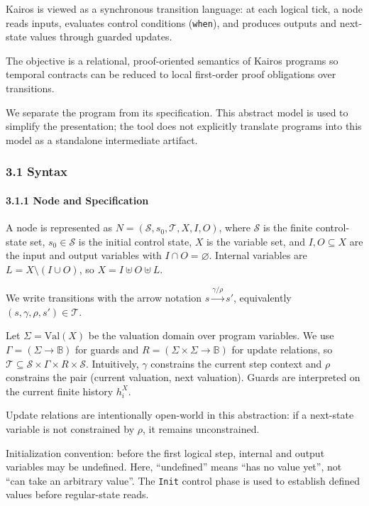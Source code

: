 \documentclass[
]{article}
\begin{document}
Kairos is viewed as a synchronous transition language: at each logical
tick, a node reads inputs, evaluates control conditions (\texttt{when}),
and produces outputs and next-state values through guarded updates.

The objective is a relational, proof-oriented semantics of Kairos
programs so temporal contracts can be reduced to local first-order proof
obligations over transitions.

We separate the program from its specification. This abstract model is
used to simplify the presentation; the tool does not explicitly
translate programs into this model as a standalone intermediate
artifact.

\subsubsection{3.1 Syntax}\label{syntax}

\paragraph{3.1.1 Node and Specification}\label{node-and-specification}

A node is represented as \(N=(\mathcal S,s_0,\mathcal T,X,I,O)\), where
\(\mathcal S\) is the finite control-state set, \(s_0\in\mathcal S\) is
the initial control state, \(X\) is the variable set, and
\(I,O\subseteq X\) are the input and output variables with
\(I\cap O=\varnothing\). Internal variables are
\(L=X\setminus(I\cup O)\), so \(X=I\uplus O\uplus L\).

We write transitions with the arrow notation
\(s \xrightarrow{\gamma/\rho} s'\), equivalently
\((s,\gamma,\rho,s')\in\mathcal T\).

Let \(\Sigma=\mathrm{Val}(X)\) be the valuation domain over program
variables. We use \(\Gamma=(\Sigma\to\mathbb B)\) for guards and
\(R=(\Sigma\times\Sigma\to\mathbb B)\) for update relations, so
\(\mathcal T\subseteq\mathcal S\times\Gamma\times R\times\mathcal S\).
Intuitively, \(\gamma\) constrains the current step context and \(\rho\)
constrains the pair (current valuation, next valuation). Guards are
interpreted on the current finite history \(h_i^X\).

Update relations are intentionally open-world in this abstraction: if a
next-state variable is not constrained by \(\rho\), it remains
unconstrained.

Initialization convention: before the first logical step, internal and
output variables may be undefined. Here, ``undefined'' means ``has no
value yet'', not ``can take an arbitrary value''. The \texttt{Init}
control phase is used to establish defined values before regular-state
reads.
\end{document}
